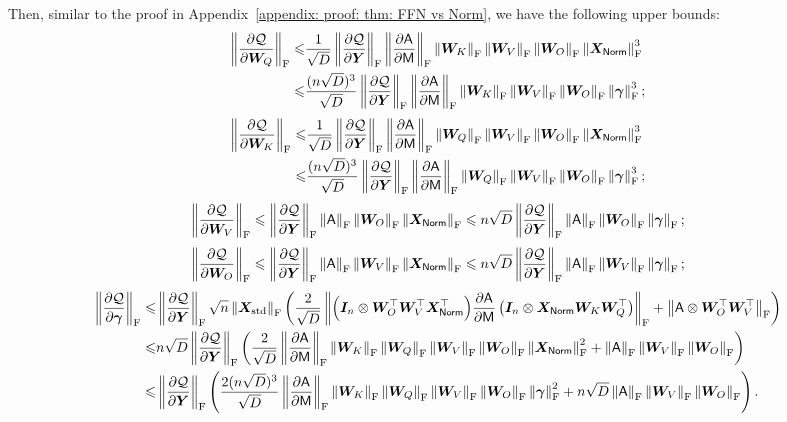 Then, similar to the proof in Appendix~\ref{appendix: proof: thm: FFN vs Norm}, we have the following upper bounds:
\begin{align*}
    \norm{\frac{\partial \cQ}{\partial\bW_{Q}}}_\rF\leq&
    \frac{1}{\sqrt{D}}\norm{\frac{\partial \cQ}{\partial\bY}}_\rF\norm{\frac{\partial\ASA}{\partial\MSA}}_\rF \norm{\bW_K}_\rF\norm{\bW_V}_\rF\norm{\bW_O}_\rF\norm{\bX_{\LN}}_\rF^3
    \\\leq&
    \frac{(n\sqrt{D})^3}{\sqrt{D}}\norm{\frac{\partial \cQ}{\partial\bY}}_\rF\norm{\frac{\partial\ASA}{\partial\MSA}}_\rF \norm{\bW_K}_\rF\norm{\bW_V}_\rF\norm{\bW_O}_\rF\norm{\bgamma}_\rF^3;
\end{align*}
\begin{align*}
    \norm{\frac{\partial \cQ}{\partial\bW_{K}}}_\rF\leq&
    \frac{1}{\sqrt{D}}\norm{\frac{\partial \cQ}{\partial\bY}}_\rF\norm{\frac{\partial\ASA}{\partial\MSA}}_\rF \norm{\bW_Q}_\rF\norm{\bW_V}_\rF\norm{\bW_O}_\rF\norm{\bX_{\LN}}_\rF^3
    \\\leq&
    \frac{(n\sqrt{D})^3}{\sqrt{D}}\norm{\frac{\partial \cQ}{\partial\bY}}_\rF\norm{\frac{\partial\ASA}{\partial\MSA}}_\rF \norm{\bW_Q}_\rF\norm{\bW_V}_\rF\norm{\bW_O}_\rF\norm{\bgamma}_\rF^3;
\end{align*}
\begin{align*}
    \norm{\frac{\partial \cQ}{\partial\bW_{V}}}_\rF\leq\norm{\frac{\partial \cQ}{\partial\bY}}_\rF
    \norm{\ASA}_\rF\norm{\bW_O}_\rF\norm{\bX_{\LN}}_\rF
    \leq n\sqrt{D}\norm{\frac{\partial \cQ}{\partial\bY}}_\rF
    \norm{\ASA}_\rF\norm{\bW_O}_\rF\norm{\bgamma}_\rF;
\end{align*}
\begin{align*}
    \norm{\frac{\partial \cQ}{\partial\bW_{O}}}_\rF\leq
    \norm{\frac{\partial \cQ}{\partial\bY}}_\rF
    \norm{\ASA}_\rF\norm{\bW_V}_\rF\norm{\bX_{\LN}}_\rF
    \leq n\sqrt{D}\norm{\frac{\partial \cQ}{\partial\bY}}_\rF
    \norm{\ASA}_\rF\norm{\bW_V}_\rF\norm{\bgamma}_\rF;
\end{align*}
\begin{align*}
    \norm{\frac{\partial \cQ}{\partial\bgamma}}_\rF
    \leq&\norm{\frac{\partial \cQ}{\partial\bY}}_\rF\sqrt{n}\norm{\bX_{\rm std}}_\rF\left(\frac{2}{\sqrt{D}}\norm{\Big(\bI_n\otimes\bW_O^\top\bW_V^\top\bX_{\LN}^\top\Big)\frac{\partial\ASA}{\partial\MSA}\left(\bI_n\otimes\bX_{\LN}\bW_K\bW_Q^\top\right)}_\rF+\norm{\ASA\otimes\bW_O^\top\bW_V^\top}_\rF\right)
    \\\leq& n\sqrt{D}\norm{\frac{\partial \cQ}{\partial\bY}}_\rF\left(\frac{2}{\sqrt{D}}
    \norm{\frac{\partial\ASA}{\partial\MSA}}_\rF \norm{\bW_K}_\rF\norm{\bW_Q}_\rF\norm{\bW_V}_\rF\norm{\bW_O}_\rF\norm{\bX_{\LN}}_\rF^2+\norm{\ASA}_\rF\norm{\bW_V}_\rF\norm{\bW_O}_\rF
    \right)
    \\\leq&
    \norm{\frac{\partial \cQ}{\partial\bY}}_\rF\left(\frac{2(n\sqrt{D})^3}{\sqrt{D}}\norm{\frac{\partial\ASA}{\partial\MSA}}_\rF\norm{\bW_K}_\rF\norm{\bW_Q}_\rF\norm{\bW_V}_\rF\norm{\bW_O}_\rF\norm{\bgamma}_\rF^2 + n\sqrt{D}\norm{\ASA}_\rF\norm{\bW_V}_\rF\norm{\bW_O}_\rF\right).
\end{align*}


